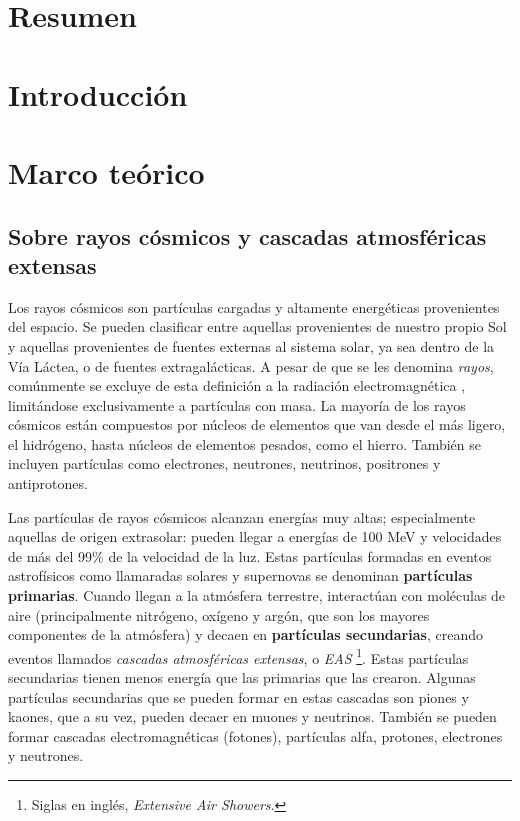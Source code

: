 \documentclass{report}
\begin{document}

\section*{Resumen}


\section*{Introducción}








\section*{Marco teórico}

\subsection*{Sobre rayos cósmicos y cascadas atmosféricas extensas}

\normalsize

Los rayos cósmicos son partículas cargadas y altamente energéticas provenientes del espacio. Se pueden clasificar entre aquellas provenientes de nuestro propio Sol y aquellas provenientes de fuentes externas al sistema solar, ya sea dentro de la Vía Láctea, o de fuentes extragalácticas. \cite{weatherMoldwin} A pesar de que se les denomina \textit{rayos}, comúnmente se excluye de esta definición a la radiación electromagnética \cite{NASACosmicopia}, limitándose exclusivamente a partículas con masa. La mayoría de los rayos cósmicos están compuestos por núcleos de elementos que van desde el más ligero, el hidrógeno, hasta núcleos de elementos pesados, como el hierro. También se incluyen partículas como electrones, neutrones, neutrinos, positrones y antiprotones. \cite{NASAImagine}

Las partículas de rayos cósmicos alcanzan energías muy altas; especialmente aquellas de origen extrasolar: pueden llegar a energías de 100 MeV y velocidades de más del 99\% de la velocidad de la luz. \cite{weatherMoldwin} Estas partículas formadas en eventos astrofísicos como llamaradas solares y supernovas se denominan \textbf{partículas primarias}. Cuando llegan a la atmósfera terrestre, interactúan con moléculas de aire (principalmente nitrógeno, oxígeno y argón, que son los mayores componentes de la atmósfera) y decaen en \textbf{partículas secundarias}, creando eventos llamados \textit{cascadas atmosféricas extensas}, o \textit{EAS} \footnote{Siglas en inglés, \textit{Extensive Air Showers}.}. Estas partículas secundarias tienen menos energía que las primarias que las crearon. Algunas partículas secundarias que se pueden formar en estas cascadas son piones y kaones, que a su vez, pueden decaer en muones y neutrinos. \cite{EAS} También se pueden formar cascadas electromagnéticas (fotones), partículas alfa, protones, electrones y neutrones.
\end{document}
